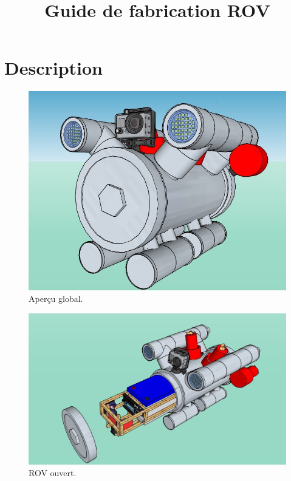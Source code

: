 \documentclass[11pt,a4paper]{article}
\title{Guide de fabrication ROV}
\begin{document}
  \maketitle
  \tableofcontents
  
  \section{Description}
    \begin{figure}[H]
      \centering
      \includegraphics[scale=0.3]{ROVFinal.jpg}
      \caption{Aperçu global.}
    \end{figure}
    \begin{figure}[H]
      \centering
      \includegraphics[scale=0.3]{ROVOuvert.jpg}
      \caption{ROV ouvert.}
    \end{figure}
    
\end{document}
